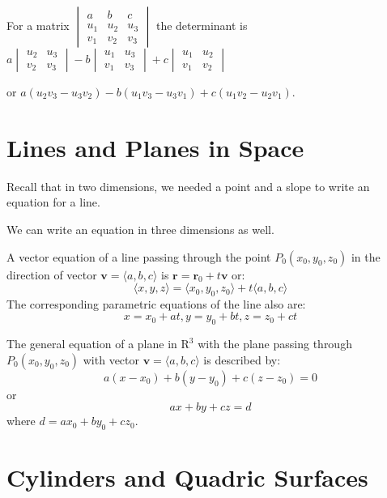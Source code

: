 \documentclass[../calc3.tex]{subfiles}
\begin{document}
For a matrix $\begin{vmatrix}
a & b & c\\
u_1 & u_2 & u_3\\
v_1 & v_2 & v_3
\end{vmatrix}$
the determinant is $a\begin{vmatrix}
    u_2 & u_3\\
    v_2 & v_3
\end{vmatrix}-b\begin{vmatrix}
    u_1 & u_3\\
    v_1 & v_3
\end{vmatrix}
+c\begin{vmatrix}
    u_1 & u_2\\
    v_1 & v_2
\end{vmatrix}$ 

or $a(u_2v_3-u_3v_2)-b(u_1v_3-u_3v_1)+c(u_1v_2-u_2v_1)$.
\section{Lines and Planes in Space}
Recall that in two dimensions, we needed a point and a slope to write an equation for a line.

We can write an equation in three dimensions as well.

A vector equation of a line passing through the point $P_0(x_0,y_0,z_0)$ in the direction of vector $\textbf{v}=\langle a,b,c \rangle$ is $\textbf{r}=\textbf{r}_0+t\textbf{v}$ or:
\[\langle x,y,z \rangle = \langle x_0,y_0,z_0 \rangle + t\langle a,b,c \rangle\]
The corresponding parametric equations of the line also are:
\[x=x_0+at, y=y_0+bt, z=z_0+ct\]

The general equation of a plane in $\mathrm{R}^3$ with the plane passing through $P_0(x_0,y_0,z_0)$ with vector $\textbf{v}=\langle a,b,c\rangle$ is described by:
\[a(x-x_0)+b(y-y_0)+c(z-z_0)=0\]
or 
\[ax+by+cz=d\] where $d=ax_0+by_0+cz_0$.
\section{Cylinders and Quadric Surfaces}
\end{document}
